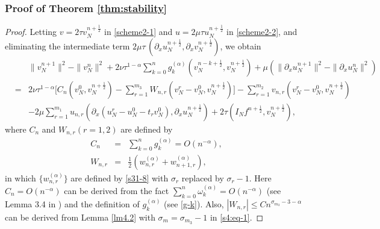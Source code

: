 \documentclass[10pt]{siamltex}
\newcommand{\px}[1][x]{\partial_{#1}}
\newcommand{\mfrac}[1][2]{\frac{1}{2}}
\begin{document}
\subsubsection{Proof of  Theorem \ref{thm:stability}}
 \begin{proof}
 Letting $v=2\tau v_N^{n+\mfrac}$ in \eqref{scheme2-1} and $u=2\mu\tau u_N^{n+\mfrac}$ in \eqref{scheme2-2},
and eliminating the intermediate term $2\mu\tau\,(\px u_N^{n+\mfrac},\px v_N^{n+\mfrac})$,
we obtain
\begin{eqnarray}
&&\|v_N^{n+1}\|^2-\|v_N^{n}\|^2+2{\nu}\tau^{1-\alpha}
\sum_{k=0}^ng^{(\alpha)}_{k}(v_N^{n-k+\mfrac},v_N^{n+\mfrac})
+\mu(\|\px[x]u_N^{n+1}\|^2-\|\px[x]u_N^{n}\|^2)\nonumber\\
&=&2{\nu}\tau^{1-\alpha}\bigg[C_n(v_N^{0},v_N^{n+\mfrac})-\sum_{r=1}^{m_3}W_{n,r}(v_N^r-v_N^{0},v_N^{n+\mfrac})\bigg]
-\sum_{r=1}^{m_2}v_{n,r}(v_N^r-v_N^{0},v_N^{n+\mfrac})\nonumber\\
&&-2\mu\sum_{r=1}^{m_1}u_{n,r}(\px[x](u_N^r-u_N^{0}-t_rv_N^{0}),\px[x]u_N^{n+\mfrac})
+2\tau(I_Nf^{n+\mfrac},v_N^{n+\mfrac}),\label{scheme2-1-3}
\end{eqnarray}
where $C_n$ and $W_{n,r}(r=1,2)$ are    defined by
\begin{eqnarray}
C_n&=&\sum_{k=0}^{n}g^{(\alpha)}_{k}=O(n^{-\alpha}),\label{c-n} \\
W_{n,r}&=&\frac{1}{2}(w_{n,r}^{(\alpha)}+w_{n+1,r}^{(\alpha)}),\label{w-n}
\end{eqnarray}
in which $\{w_{n,r}^{(\alpha)}\}$ are defined by \eqref{s31-8}
{with $\sigma_r$ replaced by $\sigma_r-1$}.
Here $C_n=O(n^{-\alpha})$ can be derived
from the  fact $\sum_{k=0}^n\omega^{(\alpha)}_k=O(n^{-\alpha})$
(see Lemma 3.4 in \cite{ZengLLT15})
and the definition of $g^{(\alpha)}_{k}$  {(see \eqref{g-k})}.
Also, $|W_{n,r}|\leq Cn^{\sigma_{m_3}-3-\alpha}$ can be derived from Lemma \ref{lm4.2}
with $\sigma_m=\sigma_{m_3}-1$  {in \eqref{s4:eq-1}}.



\end{proof}
\end{document}
